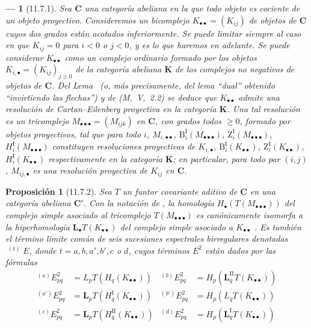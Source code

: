 \documentclass[10pt,oneside,openany]{book}
\theoremstyle{egaenv}\newtheorem*{env}{---}
\theoremstyle{egastatement}
\newtheorem*{proposition}{Proposición}
\theoremstyle{egadescription}
\newcommand{\oldpage}[2][]{\marginnote{\normalfont\scriptsize\textbf{#1}\,|\,#2}\ignorespaces}
\renewcommand{\geq}{\geqslant}
\begin{document}
\begin{env}[11.7.1]
\label{0.11.7.1}
\label{0.11.7.1-fr}
Sea $\boldsymbol{C}$ una categoría abeliana en la que todo objeto es cociente de un
objeto proyectivo.
Consideremos un bicomplejo $K_{\bullet\bullet}=(K_{ij})$ de objetos de $\boldsymbol{C}$ cuyos
dos grados están \emph{acotados inferiormente}.
Se puede limitar siempre al caso en que $K_{ij}=0$ para $i<0$ o
$j<0$, y es lo que haremos en adelante. Se puede considerar $K_{\bullet\bullet}$ como un complejo ordinario formado por los
objetos
$K_{i,\bullet}=(K_{ij})_{j\geq 0}$
de la categoría abeliana $\boldsymbol{K}$ de los complejos no negativos de objetos de
$\boldsymbol{C}$.
Del Lema~ (o, más precisamente, del lema
``dual'' obtenido ``invirtiendo las flechas'') y de (M,~V,~2.2) se deduce
que $K_{\bullet\bullet}$ admite una \emph{resolución de Cartan--Eilenberg
proyectiva} en la categoría $\boldsymbol{K}$.
Una tal resolución es un \emph{tricomplejo}
$M_{\bullet\bullet\bullet}=(M_{ijk})$ en $\boldsymbol{C}$, con grados todos $\geq 0$, formado por objetos proyectivos, tal que para todo $i$, $M_{i,\bullet\bullet}$, $\mathrm B_i^{\mathrm I}(M_{\bullet\bullet\bullet})$, $\mathrm Z_i^{\mathrm I}(M_{\bullet\bullet\bullet})$, $H_i^{\mathrm I}(M_{\bullet\bullet\bullet})$ constituyen \emph{resoluciones proyectivas} de $K_{i,\bullet}$, $\mathrm B_i^{\mathrm I}(K_{\bullet\bullet})$, $\mathrm Z_i^{\mathrm I}(K_{\bullet\bullet})$, $H_i^{\mathrm I}(K_{\bullet\bullet})$ respectivamente en la categoría $\boldsymbol{K}$; en particular, para todo par $(i,j)$, $M_{ij,\bullet}$ es una \emph{resolución
proyectiva} de $K_{ij}$ en $\boldsymbol{C}$.
\end{env}

\begin{proposition}[11.7.2]
\label{0.11.7.2}
\label{0.11.7.2-fr}
Sea $T$ un funtor covariante aditivo de $\boldsymbol{C}$ en una categoría
abeliana $\boldsymbol{C}'$.
Con la notación de , la homología
$H_\bullet(T(M_{\bullet\bullet\bullet}))$
del complejo simple asociado al tricomplejo
$T(M_{\bullet\bullet\bullet})$ es canónicamente isomorfa a la
hiperhomología $\mathbf{L}_\bullet T(K_{\bullet\bullet})$ del
\oldpage[0\textsubscript{III}]{42}
complejo simple asociado a $K_{\bullet\bullet}$
.
Es también el término límite común de seis sucesiones espectrales birregulares denotadas
$\mathop{}^{(t)}E$, donde $t=a,b,a',b',c$ o $d$, cuyos
términos $E^2$ están dados por las fórmulas
\[
\begin{aligned}
{}^{(a)}E^2_{pq}&=L_pT(H_q(K_{\bullet\bullet}))&
{}^{(b)}E^2_{pq}&=H_p(\mathbf{L}_q^{\mathrm{II}}T(K_{\bullet\bullet}))\\
{}^{(a')}E^2_{pq}&=\mathbf{L}_pT(H_q^{\mathrm I}(K_{\bullet\bullet}))&
{}^{(b')}E^2_{pq}&=H_p(L_qT(K_{\bullet\bullet}))\\
{}^{(c)}E^2_{pq}&=\mathbf{L}_pT(H_q^{\mathrm{II}}(K_{\bullet\bullet}))&
{}^{(d)}E^2_{pq}&=H_p(\mathbf{L}_q^{\mathrm I}T(K_{\bullet\bullet}))
\end{aligned}
\]
\end{proposition}
\end{document}
